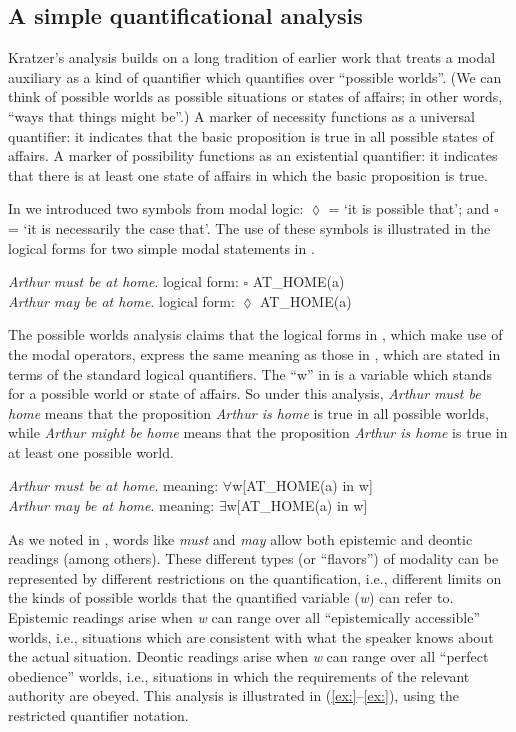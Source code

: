\subsection{A simple quantificational analysis}\label{sec:} %

Kratzer’s analysis builds on a long tradition of earlier work that treats a modal auxiliary as a kind of quantifier which quantifies over “possible worlds”. (We can think of possible worlds as possible situations or states of affairs; in other words, “ways that things might be”.) A marker of necessity functions as a universal quantifier: it indicates that the basic proposition is true in all possible states of affairs. A marker of possibility functions as an existential quantifier: it indicates that there is at least one state of affairs in which the basic proposition is true.



In  we introduced two symbols from modal logic: ${\lozenge}$ = ‘it is possible that’; and ${\square}$ = ‘it is necessarily the case that’. The use of these symbols is illustrated in the logical forms for two simple modal statements in .


\ea
\ea \textit{Arthur must be at home}.  logical form: ${\square}$ AT\_HOME(a)\\
\ex \textit{Arthur may be at home}.  logical form: ${\lozenge}$ AT\_HOME(a)
                       \z
\z


The possible worlds analysis claims that the logical forms in , which make use of the modal operators, express the same meaning as those in , which are stated in terms of the standard logical quantifiers. The “w” in  is a variable which stands for a possible world or state of affairs. So under this analysis, \textit{Arthur must be home} means that the proposition \textit{Arthur is home} is true in all possible worlds, while \textit{Arthur might be home} means that the proposition \textit{Arthur is home} is true in at least one possible world.


\ea
\ea \textit{Arthur must be at home}.  meaning: ${\forall}$w[AT\_HOME(a) in w]\\
\ex \textit{Arthur may be at home}.  meaning: ${\exists}$w[AT\_HOME(a) in w]
                       \z
\z


As we noted in , words like \textit{must} and \textit{may} allow both epistemic and deontic readings (among others). These different types (or “flavors”) of modality can be represented by different restrictions on the quantification, i.e., different limits on the kinds of possible worlds that the quantified variable (\textit{w}) can refer to. Epistemic readings arise when \textit{w} can range over all “epistemically accessible” worlds, i.e., situations which are consistent with what the speaker knows about the actual situation. Deontic readings arise when \textit{w} can range over all “perfect obedience” worlds, i.e., situations in which the requirements of the relevant authority are obeyed. This analysis is illustrated in (\ref{ex:}--\ref{ex:}), using the restricted quantifier notation.


